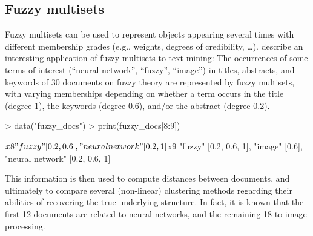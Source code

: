 \documentclass[article]{jss}
\begin{document}
\subsection{Fuzzy multisets}

Fuzzy multisets can be used to represent objects appearing several
times with different membership grades (e.g., weights, degrees of
credibility, \dots). \cite{sets:mizutani+inokuchi+miyamoto:2008}
describe an interesting application of fuzzy multisets to text mining:
The occurrences of some terms of interest (``neural network'',
``fuzzy'', ``image'') in titles, abstracts, and keywords
of 30 documents on fuzzy theory are represented by fuzzy
multisets, with varying memberships depending on whether a term occurs
in the title (degree 1), the keywords (degree 0.6), and/or the
abstract (degree 0.2).
\begin{Schunk}
\begin{Sinput}
> data("fuzzy_docs")
> print(fuzzy_docs[8:9])
\end{Sinput}
\begin{Soutput}
$x8
{"fuzzy" [{0.2, 0.6}], "neural network" [{0.2, 1}]}

$x9
{"fuzzy" [{0.2, 0.6, 1}], "image" [{0.6}], "neural network" [{0.2, 0.6,
 1}]}
\end{Soutput}
\end{Schunk}
This information is then used to compute distances between documents,
and ultimately to compare several (non-linear) clustering methods
regarding their abilities of recovering the true underlying
structure. In fact, it is known that the first 12 documents are
related to neural networks, and the remaining 18 to image
processing.
\end{document}

